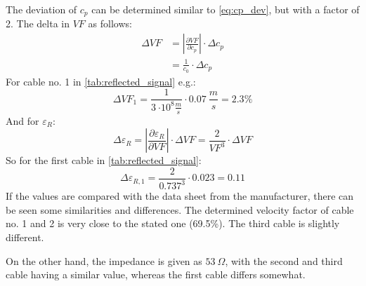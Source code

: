         The deviation of $ c_p $ can be determined similar to \cref{eq:cp_dev}, but with a factor of 2. The delta in $ VF $ as follows:
        \begin{align}
            \Delta VF&=\left|\frac{\partial VF}{\partial c_p}\right|\cdot \Delta c_p \nonumber \\
            &=\frac{1}{c_0}\cdot \Delta c_p
        \end{align}
        For cable no. 1 in \cref{tab:reflected_signal} e.g.:
        \begin{equation}
            \Delta VF_1=\frac{1}{\SI{3}{\cdot 10^8 \frac{m}{s}}}\cdot \SI{0.07}{\frac{m}{s}}=2.3\%
        \end{equation}
        And for $ \varepsilon_R $:
        \begin{equation}
            \Delta \varepsilon_R = \left|\frac{\partial \varepsilon_R}{\partial VF}\right|\cdot \Delta VF = \frac{2}{VF^3} \cdot \Delta VF
        \end{equation}
        So for the first cable in \cref{tab:reflected_signal}:
        \begin{equation}
            \Delta \varepsilon_{R,1}=\frac{2}{0.737^3}\cdot 0.023=0.11
        \end{equation}
        If the values are compared with the data sheet from the manufacturer, there can be seen some similarities and differences.
        The determined velocity factor of cable no. 1 and 2 is very close to the stated one (69.5\%). The third cable is slightly
        different.\par
        On the other hand, the impedance is given as $ \SI{53}{\Omega} $, with the second and third cable having a similar value,
        whereas the first cable differs somewhat.
